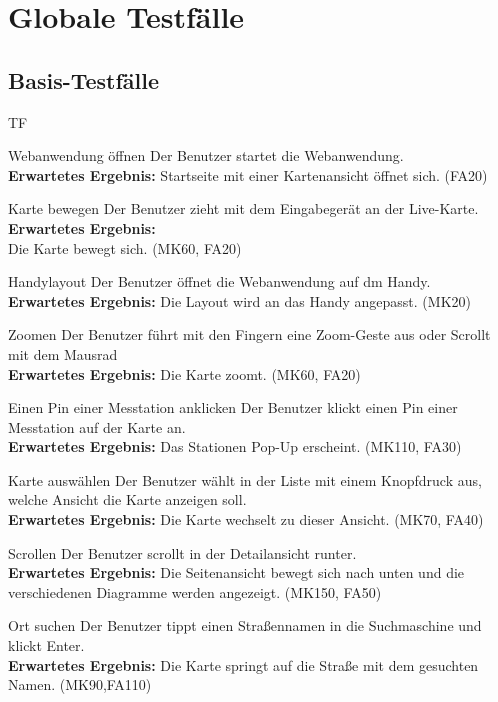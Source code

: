 \section{Globale Testfälle}
\setcounter{counter}{10}
\subsection{Basis-Testfälle}
\begin{Kriterien}{TF}

	\item[Webanwendung öffnen] Der Benutzer startet die \gls{Webanwendung}. \\ \textbf{Erwartetes Ergebnis:} Startseite mit einer Kartenansicht öffnet sich. (FA20)

	\item[Karte bewegen] Der Benutzer zieht mit dem Eingabegerät an der \gls{Live-Karte}. \textbf{Erwartetes Ergebnis:} \\ Die Karte bewegt sich.  (MK60, FA20)
    
    \item[Handylayout] Der Benutzer öffnet die Webanwendung auf dm Handy. \\ \textbf{Erwartetes Ergebnis:} Die Layout wird an das Handy angepasst. (MK20)
	
	\item[Zoomen] Der Benutzer führt mit den Fingern eine Zoom-Geste aus oder Scrollt mit dem Mausrad \\ \textbf{Erwartetes Ergebnis:} Die Karte zoomt. (MK60, FA20)
	
	\item[Einen Pin einer Messtation anklicken] Der Benutzer klickt einen Pin einer Messtation auf der Karte an. \\ \textbf{Erwartetes Ergebnis:} Das Stationen Pop-Up erscheint. (MK110,  FA30)
	
	\item[Karte auswählen] Der Benutzer wählt in der Liste mit einem Knopfdruck aus, welche Ansicht die Karte anzeigen soll. \\ \textbf{Erwartetes Ergebnis:} Die Karte wechselt zu dieser Ansicht. (MK70, FA40)
	
	\item[Scrollen] Der Benutzer scrollt in der Detailansicht runter. \\ \textbf{Erwartetes Ergebnis:} Die Seitenansicht bewegt sich nach unten und die verschiedenen Diagramme werden angezeigt. (MK150, FA50)
	
	\item[Ort suchen] Der Benutzer tippt einen Straßennamen in die Suchmaschine und klickt Enter. \\ \textbf{Erwartetes Ergebnis:} Die Karte springt auf die Straße mit dem gesuchten Namen. (MK90,FA110)
	

\end{Kriterien}
